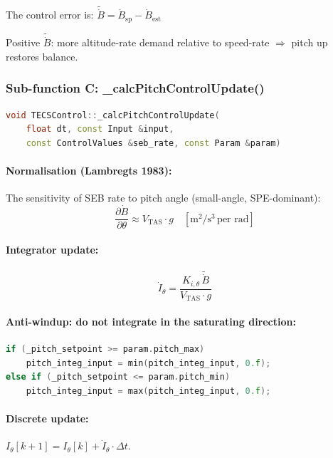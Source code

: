 \documentclass[12pt,a4paper]{article}
\begin{document}
The control error is:
$\tilde{\dot{B}} = \dot{B}_{\text{sp}} - \dot{B}_{\text{est}}$

Positive $\tilde{\dot{B}}$: more altitude-rate demand relative to speed-rate
$\Rightarrow$ pitch up restores balance.

\subsubsection{Sub-function C: \_calcPitchControlUpdate()}

\begin{lstlisting}[language=C++]
void TECSControl::_calcPitchControlUpdate(
    float dt, const Input &input,
    const ControlValues &seb_rate, const Param &param)
\end{lstlisting}

\paragraph{Normalisation (Lambregts 1983):}
The sensitivity of SEB rate to pitch angle (small-angle, SPE-dominant):
\begin{equation}
  \frac{\partial\dot{B}}{\partial\theta} \approx V_{\text{TAS}} \cdot g
  \quad [\text{m}^2/\text{s}^3\,\text{per rad}]
\end{equation}

\paragraph{Integrator update:}
\begin{equation}
  \dot{I}_\theta = \frac{K_{i,\theta}\,\tilde{\dot{B}}}{V_{\text{TAS}} \cdot g}
\end{equation}

\paragraph{Anti-windup: do not integrate in the saturating direction:}

\begin{lstlisting}[language=C++]
if (_pitch_setpoint >= param.pitch_max)
    pitch_integ_input = min(pitch_integ_input, 0.f);
else if (_pitch_setpoint <= param.pitch_min)
    pitch_integ_input = max(pitch_integ_input, 0.f);
\end{lstlisting}

\paragraph{Discrete update:} $I_\theta[k+1] = I_\theta[k] + \dot{I}_\theta \cdot \Delta t$.
\end{document}

